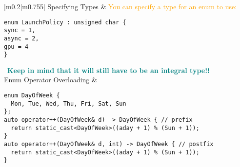 \documentclass[main.tex,fontsize=8pt,paper=a4,paper=portrait,DIV=calc]{scrartcl}
\begin{document}
\pagebreak
\begin{table}[ht!]
\begin{tabular}{|m{0.2\linewidth}|m{0.755\linewidth}|}
\hline
Specifying Types & 
\textcolor{orange}{You can specify a type for an enum to use:}\newline
\begin{lstlisting}
enum LaunchPolicy : unsigned char {
sync = 1,
async = 2,
gpu = 4
}
\end{lstlisting} 
\, \newline
\textcolor{teal}{\textbf{Keep in mind that it will still have to be an integral type!!}}\\
\hline
Enum Operator Overloading & 
\begin{lstlisting}
enum DayOfWeek {
  Mon, Tue, Wed, Thu, Fri, Sat, Sun
};
auto operator++(DayOfWeek& d) -> DayOfWeek { // prefix
  return static_cast<DayOfWeek>((aday + 1) % (Sun + 1));
}
auto operator++(DayOfWeek& d, int) -> DayOfWeek { // postfix
  return static_cast<DayOfWeek>((aday + 1) % (Sun + 1));
}
\end{lstlisting}\\
\hline
\end{tabular}

\end{table}
\end{document}
